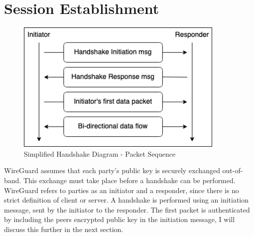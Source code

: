 \documentclass [11pt, proquest] {uwthesis}[2020/02/24]
\begin{document}
\section {Session Establishment}
\label{session_establish}
\begin{figure}
\includegraphics[width=10cm]{paper/images/simp-handshake_process.png}
\caption{Simplified Handshake Diagram - Packet Sequence }
\label{fig:simpleHandSeq}
\end{figure} 
WireGuard assumes that each party's public key is securely exchanged out-of-band. This exchange must take place before a handshake can be performed. 
WireGuard refers to parties as an initiator and a responder, since there is no strict definition of client or server. A handshake is performed using an initiation message, sent by the initiator to the responder. The first packet is authenticated by including the peers encrypted public key in the initiation message, I will discuss this further in the next section.
\end{document}
